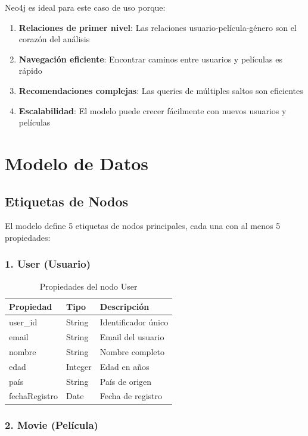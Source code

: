 \documentclass[12pt]{article}
\begin{document}
Neo4j es ideal para este caso de uso porque:

\begin{enumerate}
    \item \textbf{Relaciones de primer nivel}: Las relaciones usuario-película-género son el corazón del análisis
    \item \textbf{Navegación eficiente}: Encontrar caminos entre usuarios y películas es rápido
    \item \textbf{Recomendaciones complejas}: Las queries de múltiples saltos son eficientes
    \item \textbf{Escalabilidad}: El modelo puede crecer fácilmente con nuevos usuarios y películas
\end{enumerate}

\newpage
\section{Modelo de Datos}

\subsection{Etiquetas de Nodos}

El modelo define 5 etiquetas de nodos principales, cada una con al menos 5 propiedades:

\subsubsection{1. User (Usuario)}

\begin{table}[h]
\centering
\begin{tabular}{|l|l|l|}
\hline
\textbf{Propiedad} & \textbf{Tipo} & \textbf{Descripción} \\
\hline
user\_id & String & Identificador único \\
email & String & Email del usuario \\
nombre & String & Nombre completo \\
edad & Integer & Edad en años \\
país & String & País de origen \\
fechaRegistro & Date & Fecha de registro \\
\hline
\end{tabular}
\caption{Propiedades del nodo User}
\end{table}

\subsubsection{2. Movie (Película)}
\end{document}
